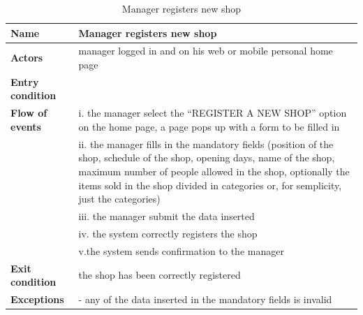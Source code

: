 \begin{table}[h!]
    \centering
    \begin{tabular}{@{}P{0.2\textwidth}P{0.70\textwidth}@{}}
        \toprule
        \textbf{Name}                 & Manager registers new shop\\
        \midrule
        \textbf{Actors}               & manager logged in and on his web or mobile personal home page\\
        \textbf{Entry condition}      & \\
        \textbf{Flow of events}            
        & i. the manager select the “REGISTER A NEW SHOP” option on the home page, a page pops up with a form to be filled in\\
        & ii.  the manager fills in the mandatory fields (position of the shop, schedule of the shop, opening days, name of the shop, maximum number of people allowed in the shop, optionally the items sold in the shop divided in categories or, for semplicity, just the categories)\\
        & iii. the manager submit the data inserted\\
        & iv. the system correctly registers the shop\\
        & v.the system sends confirmation to the manager\\
        \textbf{Exit condition}       & the shop has been correctly registered\\
        \textbf{Exceptions}           
        & - any of the data inserted in the mandatory fields is invalid\\
        \bottomrule
    \end{tabular}
\caption{Manager registers new shop}
\label{table:managerregisternewshop}
\end{table}

